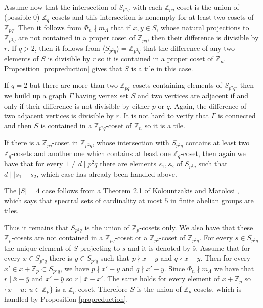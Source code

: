 \documentclass[10pt]{article}
\newcommand{\Z}{\mathbb{Z}}
\newcommand{\La}{\Lambda}
\begin{document}
        Assume now that the intersection of $S_{p^2q}$ with each $\Z_{pq}$-coset is the union of (possible 0) $\Z_q$-cosets and this intersection is nonempty for at least two cosets of $\Z_{pq}$. 
        Then it follows from $\Phi_n \nmid m_{\La}$ that if $x,y \in S$, whose natural projections to $\Z_{p^2q}$ are not contained in a proper coset of $\Z_{pq}$, then their difference is divisible by $r$. If $q>2$, then it follows from $\langle S_{p^2q}\rangle=\Z_{p^2q}$ that the difference of any two elements of $S$ is divisible by $r$ so it is contained in a proper coset of $\Z_n$. Proposition \ref{propreduction} gives that $S$ is a tile in this case. 
        
        If $q=2$ but there are more than two $\Z_{pq}$-cosets containing elements of $S_{p^2q}$, then we build up a graph $\Gamma$ having vertex set $S$ and two vertices are adjacent if and only if their difference is not divisible by either $p$ or $q$. Again, the difference of two adjacent vertices is divisible by $r$. It is not hard to verify that $\Gamma $ is connected 
        and then $S$ is contained in a $\Z_{p^2q}$-coset of $\Z_n$ so it is a tile. 
        
        If there is a 
        $\Z_{pq}$-coset in $\Z_{p^2q}$, whose intersection with $S_{p^2q}$ contains at least two $\Z_{q}$-cosets and another one which contains at least one $\Z_{q}$-coset, then again we have that for every $1 \ne d \mid p^2q$ there are elements $s_1,s_2$ of $S_{p^2q}$ such that $d \mid \mid s_1-s_2$, which case has already been handled above. 
        
        The $|S|=4$ case follows from a Theorem 2.1 of Kolountzakis and Matolcsi \cite{KMkishalmaz}, which says that spectral sets of cardinality at most $5$  in finite abelian groups are tiles.
        
        
        Thus it remains that $S_{p^2q} $ is the union of $\Z_p$-cosets only. We also have that these $\Z_p$-cosets are not contained in a $\Z_{pq}$-coset or a $\Z_{p^2}$-coset of $\Z_{p^2q}$. 
        For every $s \in S_{p^2q}$ the unique element of $S$ projecting to $s$ and it is denoted by $\bar{s}$.
        Assume that for every $x \in S_{p^2q}$ there is $y \in S_{p^2q}$ such that $p \nmid x-y$ and $q \nmid x-y$. Then for every $x' \in x+\Z_p \subset S_{p^2q}$, we have $p \nmid x'-y$ and $q \nmid x'-y$. Since $\Phi_n \nmid m_{\La}$ we have that $r \mid \bar{x}-\bar{y}$ and $\bar{x'}-\bar{y}$ so $r \mid \bar{x}-\bar{x'}$.
        The same holds for every element of $x+\Z_p$ so $\{ \overline{x+u}  \colon~ u \in \Z_p \}$ is a $\Z_p$-coset. Therefore $S$ is the union of $\Z_p$-cosets, which is handled by Proposition \ref{propreduction}.
        
\end{document}
